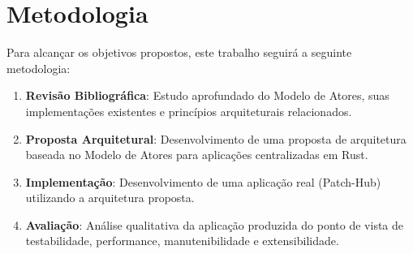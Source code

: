 \section{Metodologia}

Para alcançar os objetivos propostos, este trabalho seguirá a seguinte metodologia:

\begin{enumerate}
    \item \textbf{Revisão Bibliográfica}: Estudo aprofundado do Modelo de Atores, suas implementações existentes e princípios arquiteturais relacionados.
    
    \item \textbf{Proposta Arquitetural}: Desenvolvimento de uma proposta de arquitetura baseada no Modelo de Atores para aplicações centralizadas em Rust.
    
    \item \textbf{Implementação}: Desenvolvimento de uma aplicação real (Patch-Hub) utilizando a arquitetura proposta.
    
    \item \textbf{Avaliação}: Análise qualitativa da aplicação produzida do ponto de vista de testabilidade, performance, manutenibilidade e extensibilidade.
\end{enumerate}
